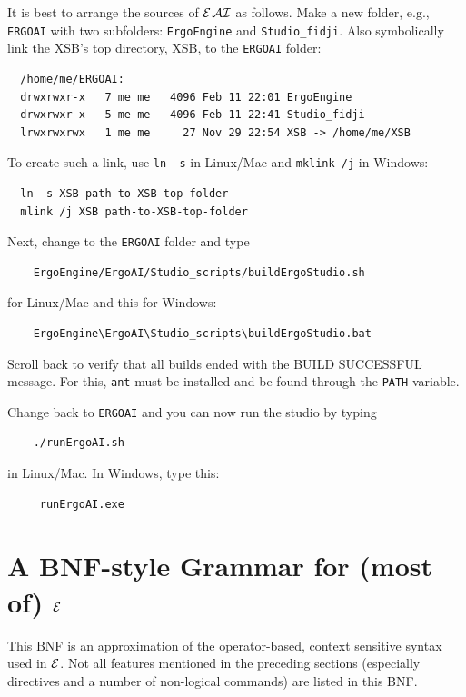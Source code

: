 \documentclass[11pt]{article}
\newcommand{\ERGO}{\mbox{\ensuremath{\cal{E}}\smaller{{\sc{RGO}}}}\xspace}
\newcommand{\ERGOAI}{\mbox{{\ensuremath{\cal{E}}\smaller{{\sc{RGO}}}}\ensuremath{\cal{AI}}}\xspace}
\newcommand{\FLSYSTEM}{\ERGO}
\begin{document}
It is best to arrange the sources of \ERGOAI as follows. Make a new folder,
e.g., \texttt{ERGOAI} with two subfolders: \texttt{ErgoEngine} and
\texttt{Studio\_fidji}. Also symbolically link the XSB's top directory, XSB,  
to the \texttt{ERGOAI} folder:
\begin{verbatim}
  /home/me/ERGOAI:
  drwxrwxr-x   7 me me   4096 Feb 11 22:01 ErgoEngine
  drwxrwxr-x   5 me me   4096 Feb 11 22:41 Studio_fidji
  lrwxrwxrwx   1 me me     27 Nov 29 22:54 XSB -> /home/me/XSB
\end{verbatim}
To create such a link, use \texttt{ln -s} in Linux/Mac and   
\texttt{mklink /j} in Windows:
\begin{verbatim}
  ln -s XSB path-to-XSB-top-folder
  mlink /j XSB path-to-XSB-top-folder
\end{verbatim}
\noindent
Next, change to the \texttt{ERGOAI} folder and type
\begin{verbatim}
    ErgoEngine/ErgoAI/Studio_scripts/buildErgoStudio.sh
\end{verbatim}
for Linux/Mac and this for Windows:
\begin{verbatim}
    ErgoEngine\ErgoAI\Studio_scripts\buildErgoStudio.bat
\end{verbatim}
Scroll back to verify that all builds ended with the BUILD SUCCESSFUL message.
For this, \texttt{ant} must be installed and be found through the
\texttt{PATH} variable.  

\noindent
Change back to \texttt{ERGOAI} and  you can
now run the studio by typing
\begin{verbatim}
    ./runErgoAI.sh
\end{verbatim}
in Linux/Mac. In Windows, type this:
\begin{verbatim}
     runErgoAI.exe
\end{verbatim}


\section{A BNF-style Grammar for (most of) \FLSYSTEM}\label{app-bnf}

This BNF is an approximation of the operator-based,
context sensitive syntax used in \FLSYSTEM. Not all features mentioned in
the preceding sections (especially directives and a number of
non-logical commands) are listed in this BNF.
\end{document}
